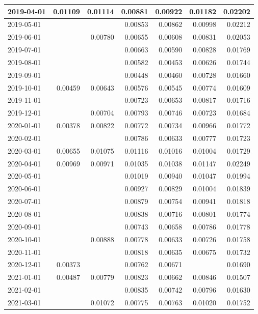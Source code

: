 \documentclass[
]{book}
\begin{document}
\begin{table}
\begin{tabular}[t]{l|r|r|r|r|r|r}
\hline
2019-04-01 & 0.01109 & 0.01114 & 0.00881 & 0.00922 & 0.01182 & 0.02202\\
\hline
2019-05-01 &  &  & 0.00853 & 0.00862 & 0.00998 & 0.02212\\
\hline
2019-06-01 &  & 0.00780 & 0.00655 & 0.00608 & 0.00831 & 0.02053\\
\hline
2019-07-01 &  &  & 0.00663 & 0.00590 & 0.00828 & 0.01769\\
\hline
2019-08-01 &  &  & 0.00582 & 0.00453 & 0.00626 & 0.01744\\
\hline
2019-09-01 &  &  & 0.00448 & 0.00460 & 0.00728 & 0.01660\\
\hline
2019-10-01 & 0.00459 & 0.00643 & 0.00576 & 0.00545 & 0.00774 & 0.01609\\
\hline
2019-11-01 &  &  & 0.00723 & 0.00653 & 0.00817 & 0.01716\\
\hline
2019-12-01 &  & 0.00704 & 0.00793 & 0.00746 & 0.00723 & 0.01684\\
\hline
2020-01-01 & 0.00378 & 0.00822 & 0.00772 & 0.00734 & 0.00966 & 0.01772\\
\hline
2020-02-01 &  &  & 0.00786 & 0.00633 & 0.00777 & 0.01723\\
\hline
2020-03-01 & 0.00655 & 0.01075 & 0.01116 & 0.01016 & 0.01004 & 0.01729\\
\hline
2020-04-01 & 0.00969 & 0.00971 & 0.01035 & 0.01038 & 0.01147 & 0.02249\\
\hline
2020-05-01 &  &  & 0.01019 & 0.00940 & 0.01047 & 0.01994\\
\hline
2020-06-01 &  &  & 0.00927 & 0.00829 & 0.01004 & 0.01839\\
\hline
2020-07-01 &  &  & 0.00879 & 0.00754 & 0.00941 & 0.01818\\
\hline
2020-08-01 &  &  & 0.00838 & 0.00716 & 0.00801 & 0.01774\\
\hline
2020-09-01 &  &  & 0.00743 & 0.00658 & 0.00786 & 0.01778\\
\hline
2020-10-01 &  & 0.00888 & 0.00778 & 0.00633 & 0.00726 & 0.01758\\
\hline
2020-11-01 &  &  & 0.00818 & 0.00635 & 0.00675 & 0.01732\\
\hline
2020-12-01 & 0.00373 &  & 0.00762 & 0.00671 &  & 0.01690\\
\hline
2021-01-01 & 0.00487 & 0.00779 & 0.00823 & 0.00662 & 0.00846 & 0.01507\\
\hline
2021-02-01 &  &  & 0.00835 & 0.00742 & 0.00796 & 0.01630\\
\hline
2021-03-01 &  & 0.01072 & 0.00775 & 0.00763 & 0.01020 & 0.01752\\

\end{tabular}
\end{table}
\end{document}
